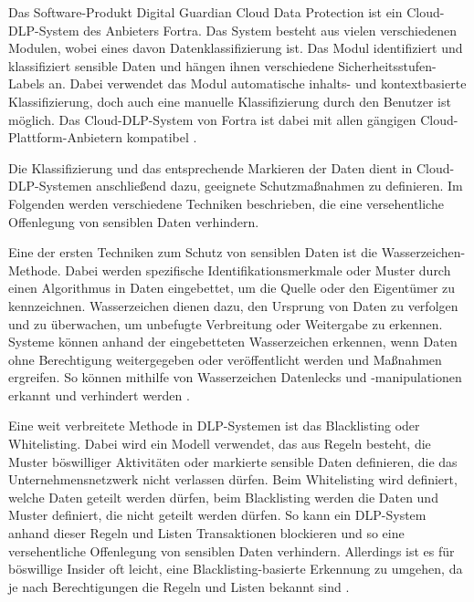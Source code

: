 Das Software-Produkt Digital Guardian Cloud Data Protection ist ein Cloud-DLP-System des Anbieters Fortra. Das System besteht aus vielen verschiedenen Modulen, wobei eines davon Datenklassifizierung ist. Das Modul identifiziert und klassifiziert sensible Daten und hängen ihnen verschiedene Sicherheitsstufen-Labels an. Dabei verwendet das Modul automatische inhalts- und kontextbasierte Klassifizierung, doch auch eine manuelle Klassifizierung durch den Benutzer ist möglich. Das Cloud-DLP-System von Fortra ist dabei mit allen gängigen Cloud-Plattform-Anbietern kompatibel \cite{DigitalGuardian.30.11.2023}.

Die Klassifizierung und das entsprechende Markieren der Daten dient in Cloud-DLP-Systemen anschließend dazu, geeignete Schutzmaßnahmen zu definieren. Im Folgenden werden verschiedene Techniken beschrieben, die eine versehentliche Offenlegung von sensiblen Daten verhindern.

Eine der ersten Techniken zum Schutz von sensiblen Daten ist die Wasserzeichen-Methode. Dabei werden spezifische Identifikationsmerkmale oder Muster durch einen Algorithmus in Daten eingebettet, um die Quelle oder den Eigentümer zu kennzeichnen. Wasserzeichen dienen dazu, den Ursprung von Daten zu verfolgen und zu überwachen, um unbefugte Verbreitung oder Weitergabe zu erkennen. Systeme können anhand der eingebetteten Wasserzeichen erkennen, wenn Daten ohne Berechtigung weitergegeben oder veröffentlicht werden und Maßnahmen ergreifen. So können mithilfe von Wasserzeichen Datenlecks und -manipulationen erkannt und verhindert werden \cite{Naik.2019}.

Eine weit verbreitete Methode in DLP-Systemen ist das Blacklisting oder Whitelisting. Dabei wird ein Modell verwendet, das aus Regeln besteht, die Muster böswilliger Aktivitäten oder markierte sensible Daten definieren, die das Unternehmensnetzwerk nicht verlassen dürfen. Beim Whitelisting wird definiert, welche Daten geteilt werden dürfen, beim Blacklisting werden die Daten und Muster definiert, die nicht geteilt werden dürfen. So kann ein DLP-System anhand dieser Regeln und Listen Transaktionen blockieren und so eine versehentliche Offenlegung von sensiblen Daten verhindern. Allerdings ist es für böswillige Insider oft leicht, eine Blacklisting-basierte Erkennung zu umgehen, da je nach Berechtigungen die Regeln und Listen bekannt sind \cite{Costante.2016}.


